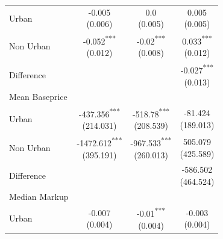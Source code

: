 \begin{tabular}{l|ccc}
\midrule
Urban & \makecell{-0.005 \\ (0.006)\\[0.25em]} & \makecell{0.0 \\ (0.005)\\[0.25em]} & \makecell{0.005 \\ (0.005)\\[0.25em]} \\
Non Urban & \makecell{-0.052\textsuperscript{***} \\ (0.012)\\[0.25em]} & \makecell{-0.02\textsuperscript{***} \\ (0.008)\\[0.25em]} & \makecell{0.033\textsuperscript{***} \\ (0.012)\\[0.25em]} \\
Difference &  &  & \makecell{-0.027\textsuperscript{***} \\ (0.013)\\[0.25em]} \\
\midrule
Mean Baseprice \\
\midrule
Urban & \makecell{-437.356\textsuperscript{***} \\ (214.031)\\[0.25em]} & \makecell{-518.78\textsuperscript{***} \\ (208.539)\\[0.25em]} & \makecell{-81.424 \\ (189.013)\\[0.25em]} \\
Non Urban & \makecell{-1472.612\textsuperscript{***} \\ (395.191)\\[0.25em]} & \makecell{-967.533\textsuperscript{***} \\ (260.013)\\[0.25em]} & \makecell{505.079 \\ (425.589)\\[0.25em]} \\
Difference &  &  & \makecell{-586.502 \\ (464.524)\\[0.25em]} \\
\midrule
Median Markup \\
\midrule
Urban & \makecell{-0.007 \\ (0.004)\\[0.25em]} & \makecell{-0.01\textsuperscript{***} \\ (0.004)\\[0.25em]} & \makecell{-0.003 \\ (0.004)\\[0.25em]} \\

\end{tabular}
